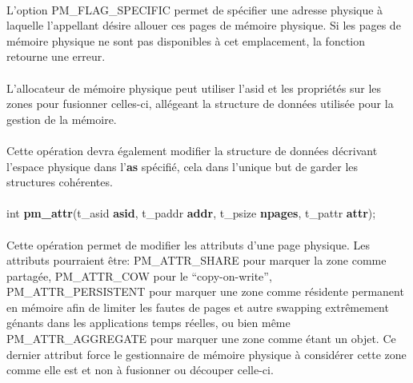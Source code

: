 \documentclass[10pt,a4wide]{article}
\begin{document}
\paragraph{}

L'option PM\_FLAG\_SPECIFIC permet de sp\'ecifier une adresse physique
\`a laquelle l'appellant d\'esire allouer ces pages de m\'emoire physique.
Si les pages de m\'emoire physique ne sont pas disponibles \`a cet
emplacement, la fonction retourne une erreur.

\paragraph{}

L'allocateur de m\'emoire physique peut utiliser l'asid et les
propri\'et\'es sur les zones pour fusionner celles-ci, all\'egeant
la structure de donn\'ees utilis\'ee pour la gestion de la m\'emoire.

\paragraph{}

Cette op\'eration devra \'egalement modifier la structure de donn\'ees
d\'ecrivant l'espace physique dans l'\textbf{as} sp\'ecifi\'e, cela
dans l'unique but de garder les structures coh\'erentes.

\paragraph{}

\hspace{1.5cm}int \textbf{pm\_attr}(t\_asid \textbf{asid},
                                    t\_paddr \textbf{addr},
                                    t\_psize \textbf{npages},
                                    t\_pattr \textbf{attr});

\paragraph{}

Cette op\'eration permet de modifier les attributs d'une page physique.
Les attributs pourraient \^etre: PM\_ATTR\_SHARE pour marquer la zone
comme partag\'ee, PM\_ATTR\_COW pour le ``copy-on-write'',
PM\_ATTR\_PERSISTENT pour marquer une zone comme r\'esidente permanent
en m\'emoire afin de limiter les fautes de pages et autre swapping
extr\^emement g\'enants dans les applications temps r\'eelles, ou bien m\^eme
PM\_ATTR\_AGGREGATE pour marquer une zone comme \'etant un objet. Ce dernier
attribut force le gestionnaire de m\'emoire physique \`a consid\'erer
cette zone comme elle est et non \`a fusionner ou d\'ecouper celle-ci.
\end{document}
